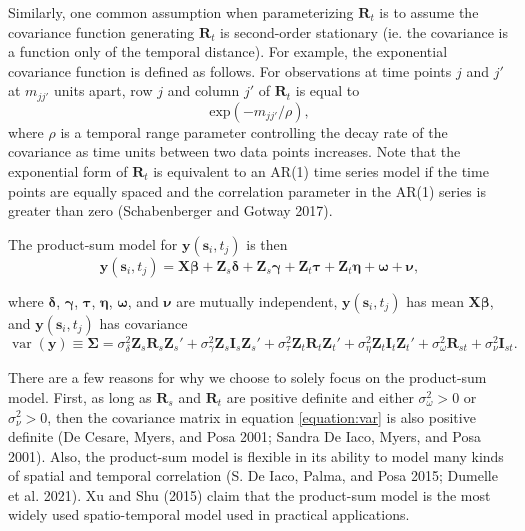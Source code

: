 \documentclass[smallextended]{svjour3}       %
\begin{document}
Similarly, one common assumption when parameterizing \(\mathbf{R}_t\) is
to assume the covariance function generating \(\mathbf{R}_t\) is
second-order stationary (ie. the covariance is a function only of the
temporal distance). For example, the exponential covariance function is
defined as follows. For observations at time points \(j\) and \(j'\) at
\(m_{jj'}\) units apart, row \(j\) and column \(j'\) of
\(\mathbf{R}_{t}\) is equal to \mbox{} \begin{equation}
\label{equation:tempcov}
\text{exp}(-m_{jj'} / \rho),
\end{equation} \noindent where \(\rho\) is a temporal range parameter
controlling the decay rate of the covariance as time units between two
data points increases. Note that the exponential form of
\(\mathbf{R}_t\) is equivalent to an AR(1) time series model if the time
points are equally spaced and the correlation parameter in the AR(1)
series is greater than zero (Schabenberger and Gotway 2017).

The product-sum model for \(\mathbf{y}(\mathbf{s}_{i}, t_j)\) is then
\mbox{} \begin{equation} \label{equation:model}
\mathbf{y}(\mathbf{s}_{i}, t_j) = \mathbf{X} \bm{\beta} + \mathbf{Z}_{s} \bm{\delta} + \mathbf{Z}_{s} \bm{\gamma} + \mathbf{Z}_t \bm{\tau} + \mathbf{Z}_t \bm{\eta} + \bm{\omega} + \bm{\nu},
\end{equation}

\noindent where \(\bm{\delta}\), \(\bm{\gamma}\), \(\bm{\tau}\),
\(\bm{\eta}\), \(\bm{\omega}\), and \(\bm{\nu}\) are mutually
independent, \(\mathbf{y}(\mathbf{s}_{i}, t_j)\) has mean
\(\mathbf{X} \bm{\beta}\), and \(\mathbf{y}(\mathbf{s}_{i}, t_j)\) has
covariance \mbox{} \begin{equation}
\label{equation:var}
\mathop{\mathrm{{var}}}(\mathbf{y}) \equiv \bm{\Sigma} = \sigma^2_{\delta} \mathbf{Z}_{s} \mathbf{R}_{s} \mathbf{Z}_{s}' + \sigma^2_{\gamma} \mathbf{Z}_{s} \mathbf{I}_{s} \mathbf{Z}_{s}' + \sigma^2_{\tau} \mathbf{Z}_t \mathbf{R}_t \mathbf{Z}_t'+ \sigma^2_{\eta} \mathbf{Z}_t \mathbf{I}_t \mathbf{Z}_t' + \sigma^2_{\omega} \mathbf{R}_{st} + \sigma^2_{\nu} \mathbf{I}_{st}.
\end{equation}

\noindent There are a few reasons for why we choose to solely focus on
the product-sum model. First, as long as \(\mathbf{R}_s\) and
\(\mathbf{R}_t\) are positive definite and either
\(\sigma^2_{\omega} > 0\) or \(\sigma^2_{\nu} > 0\), then the covariance
matrix in equation \ref{equation:var} is also positive definite (De
Cesare, Myers, and Posa 2001; Sandra De Iaco, Myers, and Posa 2001).
Also, the product-sum model is flexible in its ability to model many
kinds of spatial and temporal correlation (S. De Iaco, Palma, and Posa
2015; Dumelle et al. 2021). Xu and Shu (2015) claim that the product-sum
model is the most widely used spatio-temporal model used in practical
applications.
\end{document}
